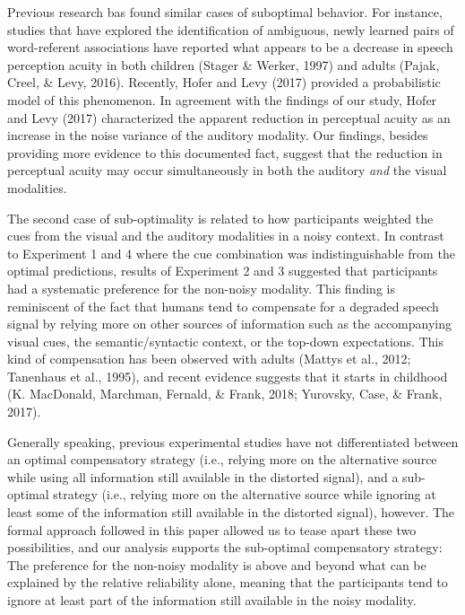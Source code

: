 \documentclass[english,,man,floatsintext]{apa6}
\theoremstyle{definition}
\theoremstyle{definition}
\theoremstyle{definition}
\theoremstyle{remark}
\begin{document}
Previous research bas found similar cases of suboptimal behavior. For
instance, studies that have explored the identification of ambiguous,
newly learned pairs of word-referent associations have reported what
appears to be a decrease in speech perception acuity in both children
(Stager \& Werker, 1997) and adults (Pajak, Creel, \& Levy, 2016).
Recently, Hofer and Levy (2017) provided a probabilistic model of this
phenomenon. In agreement with the findings of our study, Hofer and Levy
(2017) characterized the apparent reduction in perceptual acuity as an
increase in the noise variance of the auditory modality. Our findings,
besides providing more evidence to this documented fact, suggest that
the reduction in perceptual acuity may occur simultaneously in both the
auditory \emph{and} the visual modalities.

The second case of sub-optimality is related to how participants
weighted the cues from the visual and the auditory modalities in a noisy
context. In contrast to Experiment 1 and 4 where the cue combination was
indistinguishable from the optimal predictions, results of Experiment 2
and 3 suggested that participants had a systematic preference for the
non-noisy modality. This finding is reminiscent of the fact that humans
tend to compensate for a degraded speech signal by relying more on other
sources of information such as the accompanying visual cues, the
semantic/syntactic context, or the top-down expectations. This kind of
compensation has been observed with adults (Mattys et al., 2012;
Tanenhaus et al., 1995), and recent evidence suggests that it starts in
childhood (K. MacDonald, Marchman, Fernald, \& Frank, 2018; Yurovsky,
Case, \& Frank, 2017).

Generally speaking, previous experimental studies have not
differentiated between an optimal compensatory strategy (i.e., relying
more on the alternative source while using all information still
available in the distorted signal), and a sub-optimal strategy (i.e.,
relying more on the alternative source while ignoring at least some of
the information still available in the distorted signal), however. The
formal approach followed in this paper allowed us to tease apart these
two possibilities, and our analysis supports the sub-optimal
compensatory strategy: The preference for the non-noisy modality is
above and beyond what can be explained by the relative reliability
alone, meaning that the participants tend to ignore at least part of the
information still available in the noisy modality.
\end{document}
